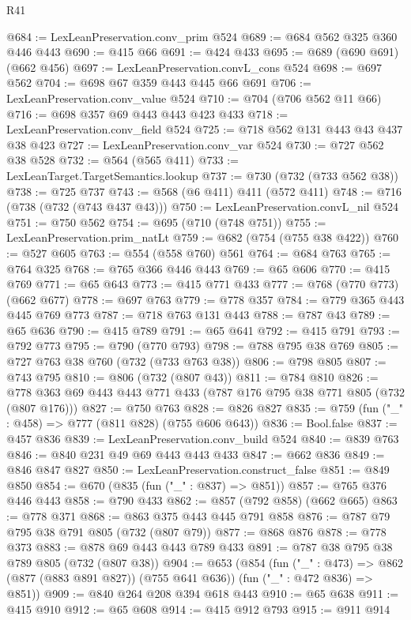 \begin{lexlean}{R41}
\begin{coremodule}
@684 := LexLeanPreservation.conv_prim @524
@689 := @684 @562 @325 @360 @446 @443
@690 := @415 @66
@691 := @424 @433
@695 := @689 (@690 @691) (@662 @456)
@697 := LexLeanPreservation.convL_cons @524
@698 := @697 @562
@704 := @698 @67 @359 @443 @445 @66 @691
@706 := LexLeanPreservation.conv_value @524
@710 := @704 (@706 @562 @11 @66)
@716 := @698 @357 @69 @443 @443 @423 @433
@718 := LexLeanPreservation.conv_field @524
@725 := @718 @562 @131 @443 @43 @437 @38 @423
@727 := LexLeanPreservation.conv_var @524
@730 := @727 @562 @38 @528
@732 := @564 (@565 @411)
@733 := LexLeanTarget.TargetSemantics.lookup
@737 := @730 (@732 (@733 @562 @38))
@738 := @725 @737
@743 := @568 (@6 @411) @411 (@572 @411)
@748 := @716 (@738 (@732 (@743 @437 @43)))
@750 := LexLeanPreservation.convL_nil @524
@751 := @750 @562
@754 := @695 (@710 (@748 @751))
@755 := LexLeanPreservation.prim_natLt
@759 := @682 (@754 (@755 @38 @422))
@760 := @527 @605
@763 := @554 (@558 @760) @561
@764 := @684 @763
@765 := @764 @325
@768 := @765 @366 @446 @443
@769 := @65 @606
@770 := @415 @769
@771 := @65 @643
@773 := @415 @771 @433
@777 := @768 (@770 @773) (@662 @677)
@778 := @697 @763
@779 := @778 @357
@784 := @779 @365 @443 @445 @769 @773
@787 := @718 @763 @131 @443
@788 := @787 @43
@789 := @65 @636
@790 := @415 @789
@791 := @65 @641
@792 := @415 @791
@793 := @792 @773
@795 := @790 (@770 @793)
@798 := @788 @795 @38 @769
@805 := @727 @763 @38 @760 (@732 (@733 @763 @38))
@806 := @798 @805
@807 := @743 @795
@810 := @806 (@732 (@807 @43))
@811 := @784 @810
@826 := @778 @363 @69 @443 @443 @771 @433 (@787 @176 @795 @38 @771 @805 (@732 (@807 @176)))
@827 := @750 @763
@828 := @826 @827
@835 := @759 (fun ("_" : @458) => @777 (@811 @828) (@755 @606 @643))
@836 := Bool.false
@837 := @457 @836
@839 := LexLeanPreservation.conv_build @524
@840 := @839 @763
@846 := @840 @231 @49 @69 @443 @443 @433
@847 := @662 @836
@849 := @846 @847 @827
@850 := LexLeanPreservation.construct_false
@851 := @849 @850
@854 := @670 (@835 (fun ("_" : @837) => @851))
@857 := @765 @376 @446 @443
@858 := @790 @433
@862 := @857 (@792 @858) (@662 @665)
@863 := @778 @371
@868 := @863 @375 @443 @445 @791 @858
@876 := @787 @79 @795 @38 @791 @805 (@732 (@807 @79))
@877 := @868 @876
@878 := @778 @373
@883 := @878 @69 @443 @443 @789 @433
@891 := @787 @38 @795 @38 @789 @805 (@732 (@807 @38))
@904 := @653
    (@854
      (fun ("_" : @473) => @862 (@877 (@883 @891 @827)) (@755 @641 @636))
      (fun ("_" : @472 @836) => @851))
@909 := @840 @264 @208 @394 @618 @443
@910 := @65 @638
@911 := @415 @910
@912 := @65 @608
@914 := @415 @912 @793
@915 := @911 @914

\end{coremodule}
\end{lexlean}

